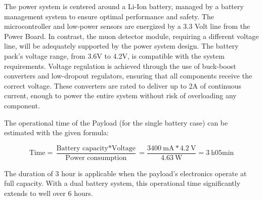 The power system is centered around a Li-Ion battery, managed by a battery management system to ensure optimal performance and safety. The microcontroller and low-power sensors are energized by a 3.3 Volt line from the Power Board. In contrast, the muon detector module, requiring a different voltage line, will be adequately supported by the power system design. The battery pack's voltage range, from 3.6V to 4.2V, is compatible with the system requirements. Voltage regulation is achieved through the use of buck-boost converters and low-dropout regulators, ensuring that all components receive the correct voltage. These converters are rated to deliver up to 2A of continuous current, enough to power the entire system without risk of overloading any component.

The operational time of the Payload (for the single battery case) can be estimated with the given formula:

\begin{equation*}
\text{Time} = \frac{\text{Battery capacity} * \text{Voltage}}{\text{Power consumption}}=\frac{\SI{3400}{\milli\ampere} * \SI{4.2}{\volt}}{\SI{4.63}{\watt}} = \SI{3}{\hour} 
 05\text{min}
\end{equation*}

The duration of 3 hour is applicable when the payload's electronics operate at full capacity. With a dual battery system, this operational time significantly extends to well over 6 hours.

